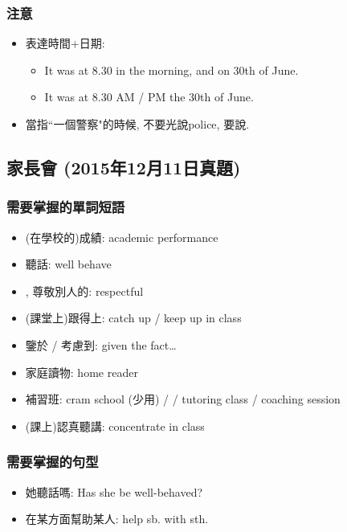 \subsubsection*{注意}
\begin{itemize}
  \itemsep0em
  \item 表達時間+日期:
  \begin{itemize}
    \itemsep0em
    \item It was at 8.30 in the morning, and on 30th of June.
    \item It was at 8.30 AM / PM  the 30th of June.
  \end{itemize}
  \item 當指``一個警察"的時候, 不要光說police, 要說.
\end{itemize}

\subsection{家長會 (2015年12月11日真題)}
\subsubsection*{需要掌握的單詞短語}
\begin{multicols}{2}
\begin{itemize}
  \itemsep0em
  \item (在學校的)成績: academic performance
  \item 聽話: well behave
  \item {}, 尊敬別人的: respectful
  \item (課堂上)跟得上: catch up / keep up in class
  \item 鑒於 / 考慮到: given the fact…
  \item 家庭讀物: home reader
  \item 補習班: cram school (少用) /  / tutoring class / coaching session
  \item (課上)認真聽講: concentrate in class
\end{itemize}
\end{multicols}

\subsubsection*{需要掌握的句型}
\begin{multicols}{2}
\begin{itemize}
  \itemsep0em
  \item 她聽話嗎: Has she be well-behaved?
  \item 在某方面幫助某人: help sb. with sth.
\end{itemize}
\end{multicols}


